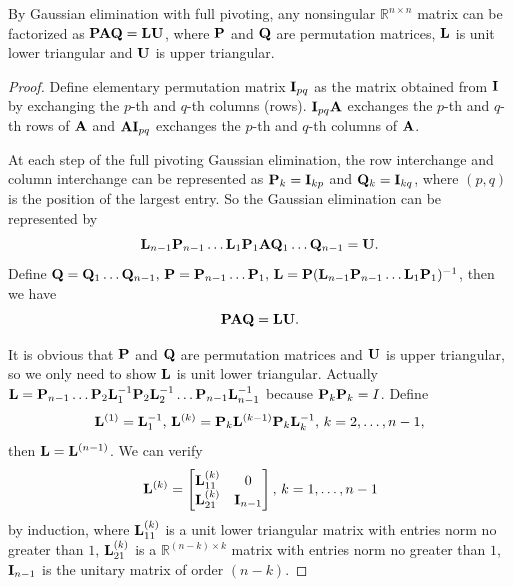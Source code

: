 \begin{thm}
    \label{thm::fullpivot}
    By Gaussian elimination with full pivoting, any nonsingular 
    $\mathbb{R}^{n\times n}$ matrix can be factorized as 
    ${\mathbf{P}}{\mathbf{A}}{\mathbf{Q}}={\mathbf{L}}{\mathbf{U}}$, where ${\mathbf{P}}$ and ${\mathbf{Q}}$ are permutation 
    matrices, ${\mathbf{L}}$ is unit lower triangular and  ${\mathbf{U}}$ is 
    upper triangular.
\end{thm}
\begin{proof}
    Define elementary permutation matrix ${\mathbf{I}}_{pq}$ as the 
    matrix obtained from ${\mathbf{I}}$ by exchanging the $p$-th and 
    $q$-th columns (rows). ${\mathbf{I}}_{pq}{\mathbf{A}}$ exchanges the $p$-th 
    and $q$-th rows of ${\mathbf{A}}$ and ${\mathbf{A}}{\mathbf{I}}_{pq}$ exchanges the 
    $p$-th and $q$-th columns of ${\mathbf{A}}$.

    At each step of the full pivoting Gaussian elimination, the 
    row interchange and column interchange can be represented 
    as ${\mathbf{P}}_k={\mathbf{I}}_{kp}$ and ${\mathbf{Q}}_k={\mathbf{I}}_{kq}$, where $(p,q)$ is 
    the position of the largest entry. So the Gaussian 
    elimination can be represented by
    $$
        {\mathbf{L}}_{n-1}{\mathbf{P}}_{n-1}\ldots{\mathbf{L}}_1{\mathbf{P}}_1{\mathbf{A}}{\mathbf{Q}}_1\ldots{\mathbf{Q}}_{n-1}={\mathbf{U}}.
    $$ 
    Define ${\mathbf{Q}}={\mathbf{Q}}_1\ldots{\mathbf{Q}}_{n-1},\,{\mathbf{P}}={\mathbf{P}}_{n-1}\ldots{\mathbf{P}}_1,\,
    {\mathbf{L}}={\mathbf{P}}({\mathbf{L}}_{n-1}{\mathbf{P}}_{n-1}\ldots{\mathbf{L}}_1{\mathbf{P}}_1)^{-1}$, then we have
    $$
        {\mathbf{P}}{\mathbf{A}}{\mathbf{Q}}={\mathbf{L}}{\mathbf{U}}.
    $$ 

    It is obvious that ${\mathbf{P}}$ and ${\mathbf{Q}}$ are permutation 
    matrices and ${\mathbf{U}}$ is upper triangular, so we only need to 
    show ${\mathbf{L}}$ is unit lower triangular. Actually ${\mathbf{L}}={\mathbf{P}}_{n-1}
    \ldots{\mathbf{P}}_2{\mathbf{L}}_1^{-1}{\mathbf{P}}_2{\mathbf{L}}_2^{-1}\ldots{\mathbf{P}}_{n-1}{\mathbf{L}}_{n-1}^{-1}
    $ because ${\mathbf{P}}_k{\mathbf{P}}_k=I$. Define
    $$
        {\mathbf{L}}^{(1)}={\mathbf{L}}_1^{-1},\,{\mathbf{L}}^{(k)}={\mathbf{P}}_k{\mathbf{L}}^{(k-1)}{\mathbf{P}}_k
        {\mathbf{L}}_k^{-1},\,k=2,\ldots,n-1,
    $$  
    then ${\mathbf{L}}={\mathbf{L}}^{(n-1)}$. We can verify
    \begin{equation}
        \label{eq::fullpivL}
        {\mathbf{L}}^{(k)}=
        \begin{bmatrix}
            {\mathbf{L}}_{11}^{(k)}&0\\
            {\mathbf{L}}_{21}^{(k)}&{\mathbf{I}}_{n-1}
        \end{bmatrix},\,k=1,\ldots,n-1
    \end{equation}
    by induction, where ${\mathbf{L}}_{11}^{(k)}$ is a unit lower 
    triangular matrix with entries norm no greater than $1$, 
    ${\mathbf{L}}_{21}^{(k)}$ is a $\mathbb{R}^{(n-k)\times k}$ matrix 
    with entries norm no greater than $1$, ${\mathbf{I}}_{n-1}$ is the 
    unitary matrix of order $(n-k)$.


\end{proof}
